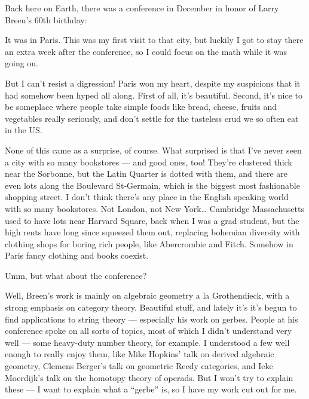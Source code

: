 \documentclass{article}
\def\tightlist{}
\renewcommand{\texttt}[1]{%
  \begingroup
  \ttfamily
  \begingroup\lccode`~=`/\lowercase{\endgroup\def~}{/\discretionary{}{}{}}%
  \begingroup\lccode`~=`[\lowercase{\endgroup\def~}{[\discretionary{}{}{}}%
  \begingroup\lccode`~=`.\lowercase{\endgroup\def~}{.\discretionary{}{}{}}%
  \catcode`/=\active\catcode`[=\active\catcode`.=\active
  \scantokens{#1\noexpand}%
  \endgroup
}
\begin{document}
Back here on Earth, there was a conference in December in honor of Larry
Breen's 60th birthday:


It was in Paris. This was my first visit to that city, but luckily I got
to stay there an extra week after the conference, so I could focus on
the math while it was going on.

But I can't resist a digression! Paris won my heart, despite my
suspicions that it had somehow been hyped all along. First of all, it's
beautiful. Second, it's nice to be someplace where people take simple
foods like bread, cheese, fruits and vegetables really seriously, and
don't settle for the tasteless crud we so often eat in the US.

None of this came as a surprise, of course. What surprised is that I've
never seen a city with so many bookstores --- and good ones, too!
They're clustered thick near the Sorbonne, but the Latin Quarter is
dotted with them, and there are even lots along the Boulevard
St-Germain, which is the biggest most fashionable shopping street. I
don't think there's any place in the English speaking world with so many
bookstores. Not London, not New York\ldots{} Cambridge Massachusetts
used to have lots near Harvard Square, back when I was a grad student,
but the high rents have long since squeezed them out, replacing bohemian
diversity with clothing shops for boring rich people, like Abercrombie
and Fitch. Somehow in Paris fancy clothing and books coexist.

Umm, but what about the conference?

Well, Breen's work is mainly on algebraic geometry a la Grothendieck,
with a strong emphasis on category theory. Beautiful stuff, and lately
it's it's begun to find applications to string theory --- especially his
work on gerbes. People at his conference spoke on all sorts of topics,
most of which I didn't understand very well --- some heavy-duty number
theory, for example. I understood a few well enough to really enjoy
them, like Mike Hopkins' talk on derived algebraic geometry, Clemens
Berger's talk on geometric Reedy categories, and Ieke Moerdijk's talk on
the homotopy theory of operads. But I won't try to explain these --- I
want to explain what a ``gerbe'' is, so I have my work cut out for me.
\end{document}
